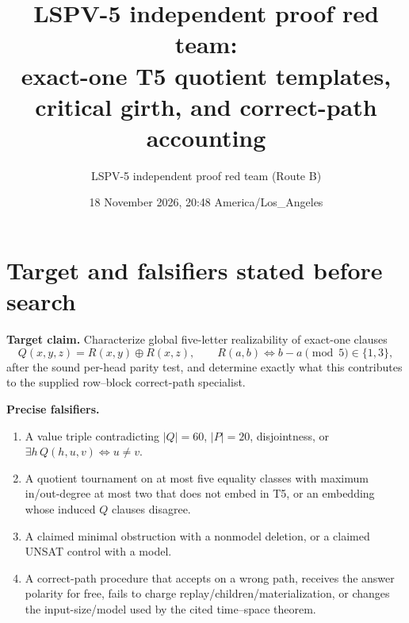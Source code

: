 \documentclass[11pt]{article}
\title{LSPV-5 independent proof red team:\\exact-one T5 quotient templates, critical girth, and correct-path accounting}
\author{LSPV-5 independent proof red team (Route B)}
\date{18 November 2026, 20:48 America/Los\_Angeles}
\begin{document}
\maketitle

\begin{center}
\end{center}

\section{Target and falsifiers stated before search}
\textbf{Target claim.}  Characterize global five-letter realizability of exact-one clauses
\[
Q(x,y,z)=R(x,y)\oplus R(x,z),\qquad
R(a,b)\Longleftrightarrow b-a\pmod 5\in\{1,3\},
\]
after the sound per-head parity test, and determine exactly what this contributes to the supplied row--block correct-path specialist.

\textbf{Precise falsifiers.}
\begin{enumerate}
\item A value triple contradicting $|Q|=60$, $|P|=20$, disjointness, or $\exists h\,Q(h,u,v)\iff u\ne v$.
\item A quotient tournament on at most five equality classes with maximum in/out-degree at most two that does not embed in T5, or an embedding whose induced $Q$ clauses disagree.
\item A claimed minimal obstruction with a nonmodel deletion, or a claimed UNSAT control with a model.
\item A correct-path procedure that accepts on a wrong path, receives the answer polarity for free, fails to charge replay/children/materialization, or changes the input-size/model used by the cited time--space theorem.
\end{enumerate}
\end{document}
